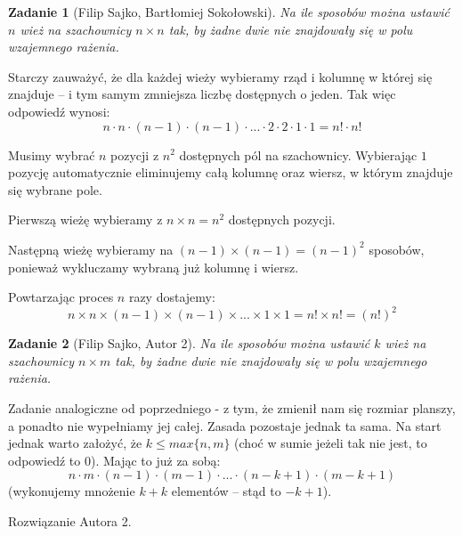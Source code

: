 \documentclass{mwart}
\newtheorem{zad}{Zadanie}[section]
\begin{document}
\begin{zad}[Filip Sajko, Bartłomiej Sokołowski]
    Na ile sposobów można ustawić $n$ wież na szachownicy
    $n \times n$ tak, by żadne dwie nie znajdowały się w
    polu wzajemnego rażenia.
\end{zad}
\begin{mdframed}
    Starczy zauważyć, że dla każdej wieży wybieramy rząd i kolumnę
    w której się znajduje -- i tym samym zmniejsza liczbę dostępnych
    o jeden. Tak więc odpowiedź wynosi: \[n \cdot n \cdot (n-1) \cdot
        (n-1) \cdot ... \cdot 2 \cdot 2 \cdot 1 \cdot 1 =  n! \cdot n!\]
\end{mdframed}
\begin{mdframed}
    Musimy wybrać $n$ pozycji z $n^2$ dostępnych pól na szachownicy. Wybierając
    $1$ pozycję automatycznie eliminujemy całą kolumnę oraz wiersz, w którym znajduje się wybrane pole.
    \item Pierwszą wieżę wybieramy z $n \times n = n^2$ dostępnych pozycji.
    \item Następną wieżę wybieramy na $(n-1) \times (n-1) = (n-1)^2$ sposobów, ponieważ wykluczamy wybraną już kolumnę i wiersz.
    \item Powtarzając proces $n$ razy dostajemy:
    \[n \times n \times (n-1) \times (n - 1) \times ... \times 1 \times 1 = n! \times n! = (n!)^2\]
\end{mdframed}




\begin{zad}[Filip Sajko, Autor 2]
    Na ile sposobów można ustawić $k$ wież na szachownicy $n \times m$
    tak, by żadne dwie nie znajdowały się w polu wzajemnego rażenia.
\end{zad}
\begin{mdframed}
    Zadanie analogiczne od poprzedniego - z tym, że zmienił nam się
    rozmiar planszy, a ponadto nie wypełniamy jej całej. Zasada
    pozostaje jednak ta sama. Na start jednak warto założyć, że
    $k \leq max\{n, m\}$ (choć w sumie jeżeli tak nie jest, to
    odpowiedź to 0). Mając to już za sobą:
    \[n \cdot m \cdot (n-1) \cdot (m-1) \cdot ... \cdot (n - k +1) \cdot (m -k +1)\]
    (wykonujemy mnożenie $k + k$ elementów -- stąd to $-k + 1$).
\end{mdframed}
\begin{mdframed}
    Rozwiązanie Autora 2.
\end{mdframed}
\end{document}

